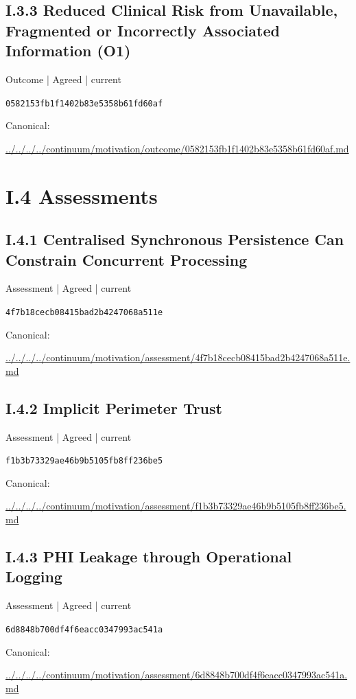 \documentclass[10pt,a4paper]{article}
\begin{document}
\subsection*{I.3.3 Reduced Clinical Risk from Unavailable, Fragmented or Incorrectly Associated Information (O1)}
{\small Outcome | Agreed | current}\par
\texttt{0582153fb1f1402b83e5358b61fd60af}\par
Canonical: \par
{\footnotesize\url{../../../../continuum/motivation/outcome/0582153fb1f1402b83e5358b61fd60af.md}}\par
\section*{I.4 Assessments}
\subsection*{I.4.1 Centralised Synchronous Persistence Can Constrain Concurrent Processing}
{\small Assessment | Agreed | current}\par
\texttt{4f7b18cecb08415bad2b4247068a511e}\par
Canonical: \par
{\footnotesize\url{../../../../continuum/motivation/assessment/4f7b18cecb08415bad2b4247068a511e.md}}\par
\subsection*{I.4.2 Implicit Perimeter Trust}
{\small Assessment | Agreed | current}\par
\texttt{f1b3b73329ae46b9b5105fb8ff236be5}\par
Canonical: \par
{\footnotesize\url{../../../../continuum/motivation/assessment/f1b3b73329ae46b9b5105fb8ff236be5.md}}\par
\subsection*{I.4.3 PHI Leakage through Operational Logging}
{\small Assessment | Agreed | current}\par
\texttt{6d8848b700df4f6eacc0347993ac541a}\par
Canonical: \par
{\footnotesize\url{../../../../continuum/motivation/assessment/6d8848b700df4f6eacc0347993ac541a.md}}\par
\end{document}
